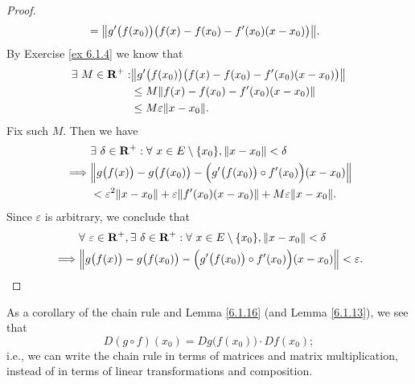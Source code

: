 \begin{proof}
\begin{align*}
         & = \norm*{g'\big(f(x_0)\big) \big(f(x) - f(x_0) - f'(x_0) (x - x_0)\big)}.
    \end{align*}
    By Exercise \ref{ex 6.1.4} we know that
    \begin{align*}
        \exists\ M \in \mathbf{R}^+ : & \norm*{g'\big(f(x_0)\big) \big(f(x) - f(x_0) - f'(x_0) (x - x_0)\big)} \\
                                      & \leq M \norm*{f(x) - f(x_0) - f'(x_0) (x - x_0)}                       \\
                                      & \leq M \varepsilon \norm*{x - x_0}.
    \end{align*}
    Fix such \(M\).
    Then we have
    \begin{align*}
                 & \exists\ \delta \in \mathbf{R}^+ : \forall\ x \in E \setminus \{x_0\}, \norm*{x - x_0} < \delta         \\
        \implies & \norm*{g\big(f(x)\big) - g\big(f(x_0)\big) - \Big(g'\big(f(x_0)\big) \circ f'(x_0)\Big) (x - x_0)}      \\
                 & < \varepsilon^2 \norm*{x - x_0} + \varepsilon \norm*{f'(x_0)(x - x_0)} + M \varepsilon \norm*{x - x_0}.
    \end{align*}
    Since \(\varepsilon\) is arbitrary, we conclude that
    \begin{align*}
                 & \forall\ \varepsilon \in \mathbf{R}^+, \exists\ \delta \in \mathbf{R}^+ : \forall\ x \in E \setminus \{x_0\}, \norm*{x - x_0} < \delta \\
        \implies & \norm*{g\big(f(x)\big) - g\big(f(x_0)\big) - \Big(g'\big(f(x_0)\big) \circ f'(x_0)\Big) (x - x_0)} < \varepsilon.
    \end{align*}
\end{proof}

\begin{note}
    As a corollary of the chain rule and Lemma \ref{6.1.16} (and Lemma \ref{6.1.13}), we see that
    \[
        D (g \circ f)(x_0) = D g\big(f(x_0)\big) \cdot D f(x_0);
    \]
    i.e., we can write the chain rule in terms of matrices and matrix multiplication, instead of in terms of linear transformations and composition.
\end{note}

